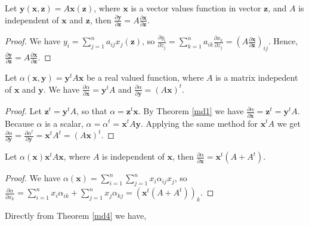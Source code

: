\begin{theorem} \label{md2}
Let $\bm{y}(\bm{x}, \bm{z}) = A\bm{x}(\bm{z})$, where $\bm{x}$ is a vector values function in vector $\bm{z}$, and $A$ is independent of $\bm{x}$ and $\bm{z}$, then $\frac{\partial \bm{y}}{\partial \bm{z}} = A \frac{\partial \bm{x}}{\partial \bm{z}}$.
\end{theorem}

\begin{proof}
We have $y_i = \sum_{j = 1}^n a_{ij} x_j(\bm{z})$, so $\frac{\partial y_i}{\partial z_j} = \sum_{k = 1}^n a_{ik} \frac{\partial x_k}{\partial z_j} = \left(A \frac{\partial \bm{x}}{\partial \bm{z}}\right)_{ij}$.
Hence, $\frac{\partial \bm{y}}{\partial \bm{z}} = A \frac{\partial \bm{x}}{\partial \bm{z}}$.
\end{proof}


\begin{theorem} \label{md3}
Let $\alpha(\bm{x}, \bm{y}) = \bm{y}^t A \bm{x}$ be a real valued function, where $A$ is a matrix indepedent of $\bm{x}$ and $\bm{y}$.
We have $\frac{\partial \alpha}{\partial \bm{x}} = \bm{y}^t A$ and $\frac{\partial \alpha}{\partial \bm{y}} = (A \bm{x})^t$.
\end{theorem}

\begin{proof}
Let $\bm{z}^t = \bm{y}^t A$, so that $\alpha = \bm{z}^t \bm{x}$.
By Theorem \ref{md1} we have $\frac{\partial \alpha}{\partial \bm{x}} = \bm{z}^t = \bm{y}^t A$.
Because $\alpha$ is a scalar, $\alpha = \alpha^t = \bm{x}^t A \bm{y}$.
Applying the same method for $\bm{x}^t A$ we get $\frac{\partial \alpha}{\partial \bm{y}} = \frac{\partial \alpha^t}{\partial \bm{y}} = \bm{x}^t A^t = (A \bm{x})^t$.
\end{proof}


\begin{theorem} \label{md4}
Let $\alpha(\bm{x}) \bm{x}^t A \bm{x}$, where $A$ is independent of $\bm{x}$, then $\frac{\partial \alpha}{\partial \bm{x}} = \bm{x}^t(A + A^t)$.
\end{theorem}

\begin{proof}
We have $\alpha(\bm{x}) = \sum_{i = 1}^n \sum_{j = 1}^n x_i \alpha_{ij} x_j$, so $\frac{\partial \alpha}{\partial x_k} = \sum_{i = 1}^n x_i \alpha_{ik} + \sum_{j = 1}^n x_j \alpha_{kj} = \left(\bm{x}^t (A + A^t)\right)_{k}$.
\end{proof}

Directly from Theorem \ref{md4} we have,

